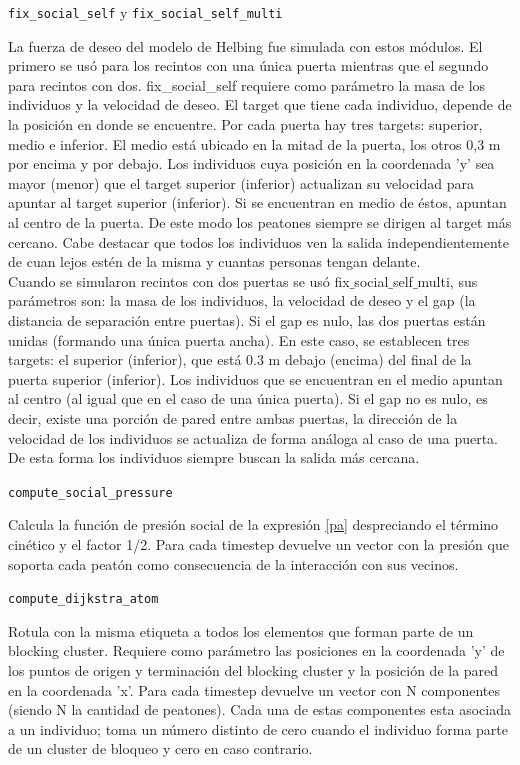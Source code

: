 {\Large {\tt fix\_social\_self} y {\tt fix\_social\_self\_multi}}

La fuerza de deseo del modelo de Helbing fue simulada con estos módulos. El primero se usó para los recintos con una única puerta mientras que el segundo para recintos con dos. 
fix\_social\_self requiere como parámetro la masa de los individuos y la velocidad de deseo. El target que tiene cada individuo, depende de la posición en donde se encuentre. Por cada puerta hay tres targets: superior, medio e inferior. El medio está ubicado en la mitad de la puerta, los otros 0,3 m por encima y por debajo.  Los individuos cuya posición en la coordenada 'y' sea mayor (menor) que el target superior (inferior) actualizan su velocidad para apuntar al target superior (inferior). Si se encuentran en medio de éstos, apuntan al centro de la puerta. De este modo los peatones siempre se dirigen al target más cercano. Cabe destacar que todos los individuos ven la salida independientemente de cuan lejos estén de la misma y cuantas personas tengan delante.\\  

Cuando se simularon recintos con dos puertas se usó fix$\_$social$\_$self$\_$multi, sus parámetros son: la masa de los individuos, la velocidad de deseo y el gap (la distancia de separación entre puertas). Si el gap es nulo, las dos puertas están unidas (formando una única puerta ancha). En este caso, se establecen tres targets: el superior (inferior), que está 0.3 m debajo (encima) del final de la puerta superior (inferior). Los individuos que se encuentran en el medio apuntan al centro (al igual que en el caso de una única puerta).
Si el gap no es nulo, es decir, existe una porción de pared entre ambas puertas, la dirección de la velocidad de los individuos se actualiza de forma análoga al caso de una puerta. De esta forma los individuos siempre buscan la salida más cercana. 

{\Large {\tt compute\_social\_pressure}}

Calcula la función de presión social de la expresión \eqref{pa} despreciando el término cinético y el factor 1/2. Para cada timestep devuelve un vector con la presión que soporta cada peatón como consecuencia de la interacción con sus vecinos. 

{\Large \tt {compute\_dijkstra\_atom}}

Rotula con la misma etiqueta a todos los elementos que forman parte de un blocking cluster. Requiere como parámetro las posiciones en la coordenada 'y' de los puntos de origen y terminación del blocking cluster y la posición de la pared en la coordenada 'x'. Para cada timestep devuelve un vector con N componentes (siendo N la cantidad de peatones). Cada una de estas componentes esta asociada a un individuo; toma un número distinto de cero cuando el individuo forma parte de un cluster de bloqueo y cero en caso contrario.

